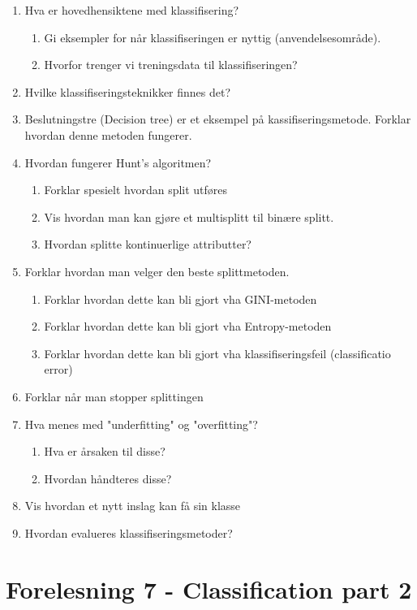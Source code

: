 		\begin{enumerate}
			\item Hva er hovedhensiktene med klassifisering?
				\begin{enumerate}
					\item Gi eksempler for når klassifiseringen er nyttig (anvendelsesområde).
					\item Hvorfor trenger vi treningsdata til klassifiseringen?
				\end{enumerate}
			\item Hvilke klassifiseringsteknikker finnes det?
			\item Beslutningstre (Decision tree) er et eksempel på kassifiseringsmetode.
			Forklar hvordan denne metoden fungerer.
			\item Hvordan fungerer Hunt's algoritmen?
				\begin{enumerate}
					\item Forklar spesielt hvordan split utføres
					\item Vis hvordan man kan gjøre et multisplitt til binære splitt.
					\item Hvordan splitte kontinuerlige attributter?
				\end{enumerate}
			\item Forklar hvordan man velger den beste splittmetoden.
				\begin{enumerate}
					\item Forklar hvordan dette kan bli gjort vha GINI-metoden
					\item Forklar hvordan dette kan bli gjort vha Entropy-metoden
					\item Forklar hvordan dette kan bli gjort vha klassifiseringsfeil (classificatio error)
				\end{enumerate}
			\item Forklar når man stopper splittingen
			\item Hva menes med "underfitting" og "overfitting"?
				\begin{enumerate}
					\item Hva er årsaken til disse?
					\item Hvordan håndteres disse?
				\end{enumerate}
			\item Vis hvordan et nytt inslag kan få sin klasse
			\item Hvordan evalueres klassifiseringsmetoder?
		\end{enumerate}

	\section{Forelesning 7 - Classification part 2}

